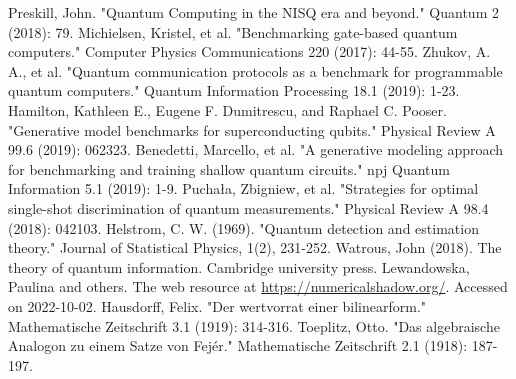 \documentclass[preprint,12pt, a4paper]{elsarticle}
\newcommand{\1}{{\rm 1\hspace{-0.9mm}l}}
\begin{document}
\begin{thebibliography}{00}

 Preskill, John. "Quantum Computing in the NISQ era and
beyond." Quantum 2 (2018): 79.
 Michielsen, Kristel, et al. "Benchmarking
gate-based quantum computers." Computer Physics Communications 220 (2017):
44-55.
 Zhukov, A. A., et al. "Quantum communication
protocols as a benchmark for programmable quantum computers." Quantum
Information Processing 18.1 (2019): 1-23.
 Hamilton, Kathleen E., Eugene F. Dumitrescu,
and Raphael C. Pooser. "Generative model benchmarks for superconducting
qubits." Physical Review A 99.6 (2019): 062323.
 Benedetti, Marcello, et al. "A generative
modeling approach for benchmarking and training shallow quantum circuits." npj
Quantum Information 5.1 (2019): 1-9.
 Puchała, Zbigniew, et al. "Strategies for
optimal single-shot discrimination of quantum measurements." Physical Review A
98.4 (2018): 042103.
 Helstrom, C. W. (1969). "Quantum detection and estimation theory." Journal of Statistical Physics, 1(2), 231-252.
 Watrous, John (2018). The theory of quantum information. Cambridge university press.
 Lewandowska, Paulina and others. The web resource at \url{https://numericalshadow.org/}. Accessed on 2022-10-02.
 Hausdorff, Felix. "Der wertvorrat einer bilinearform." Mathematische Zeitschrift 3.1 (1919): 314-316.
 Toeplitz, Otto. "Das algebraische Analogon zu einem Satze von Fejér." Mathematische Zeitschrift 2.1 (1918): 187-197.
\end{thebibliography}
\end{document}
